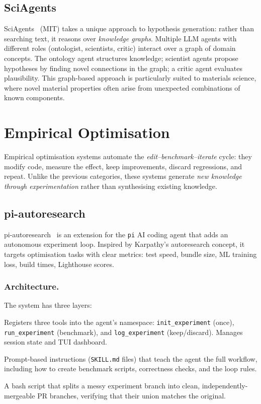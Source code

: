\documentclass[11pt,a4paper]{article}
\begin{document}
\subsection{SciAgents}

SciAgents~\citep{sciagents2024} (MIT) takes a unique approach to
hypothesis generation: rather than searching text, it reasons over
\emph{knowledge graphs}. Multiple LLM agents with different roles
(ontologist, scientists, critic) interact over a graph of domain
concepts. The ontology agent structures knowledge; scientist agents
propose hypotheses by finding novel connections in the graph; a critic
agent evaluates plausibility. This graph-based approach is particularly
suited to materials science, where novel material properties often arise
from unexpected combinations of known components.

\section{Empirical Optimisation}
\label{sec:empirical}

Empirical optimisation systems automate the
\emph{edit--benchmark--iterate} cycle: they modify code, measure the
effect, keep improvements, discard regressions, and repeat. Unlike the
previous categories, these systems generate \emph{new knowledge through
experimentation} rather than synthesising existing knowledge.

\subsection{pi-autoresearch}

pi-autoresearch~\citep{piautoresearch2025} is an extension for the
\texttt{pi} AI coding agent that adds an autonomous experiment loop.
Inspired by Karpathy's autoresearch concept, it targets optimisation
tasks with clear metrics: test speed, bundle size, ML training loss,
build times, Lighthouse scores.

\subsubsection{Architecture.}
The system has three layers:

\begin{description}[nosep, style=nextline, labelwidth=3cm, leftmargin=3.5cm]
  \item[Extension] Registers three tools into the agent's namespace:
    \texttt{init\_experiment} (once), \texttt{run\_experiment}
    (benchmark), and \texttt{log\_experiment} (keep/discard). Manages
    session state and TUI dashboard.
  \item[Skills] Prompt-based instructions (\texttt{SKILL.md} files) that
    teach the agent the full workflow, including how to create benchmark
    scripts, correctness checks, and the loop rules.
  \item[Finalize] A bash script that splits a messy experiment branch
    into clean, independently-mergeable PR branches, verifying that
    their union matches the original.
\end{description}
\end{document}
